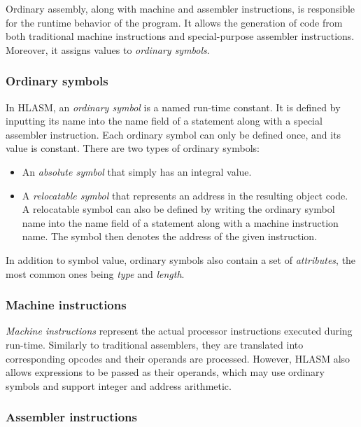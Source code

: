 Ordinary assembly, along with machine and assembler instructions, is responsible for the runtime behavior of the program. It allows the generation of code from both traditional machine instructions and special-purpose assembler instructions. Moreover, it assigns values to \emph{ordinary symbols}.

\subsubsection{Ordinary symbols}
\label{ord_sym}

In HLASM, an \emph{ordinary symbol} is a named run-time constant. It is defined by inputting its name into the name field of a statement along with a special assembler instruction. Each ordinary symbol can only be defined once, and its value is constant. There are two types of ordinary symbols:
 
\begin{itemize}
	\item An \emph{absolute symbol} that simply has an integral value.
	\item A \emph{relocatable symbol} that represents an address in the resulting object code. A relocatable symbol can also be defined by writing the ordinary symbol name into the name field of a statement along with a machine instruction name. The symbol then denotes the address of the given instruction.
\end{itemize}

In addition to symbol value, ordinary symbols also contain a set of \emph{attributes}, the most common ones being \emph{type} and \emph{length}.

\subsubsection{Machine instructions}
\label{mach_instr}

\emph{Machine instructions} represent the actual processor instructions executed during run-time. Similarly to traditional assemblers, they are translated into corresponding opcodes and their operands are processed. However, HLASM also allows expressions to be passed as their operands, which may use ordinary symbols and support integer and address arithmetic.

\subsubsection{Assembler instructions}
\label{asm_instrs}


